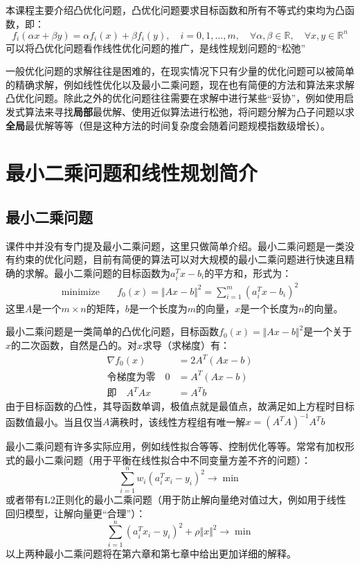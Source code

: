 \documentclass[12pt,a4paper]{book}
\begin{document}
本课程主要介绍凸优化问题，凸优化问题要求目标函数和所有不等式约束均为凸函数，即：
$$f_i(\alpha x + \beta y) = \alpha f_i(x) + \beta f_i(y) , \quad i = 0, 1, \ldots, m,\quad \forall \alpha, \beta \in \mathbb{R} ,\quad \forall x, y \in \mathbb{R}^n $$
可以将凸优化问题看作线性优化问题的推广，是线性规划问题的“松弛”

一般优化问题的求解往往是困难的，在现实情况下只有少量的优化问题可以被简单的精确求解，例如线性优化以及最小二乘问题，现在也有简便的方法和算法来求解凸优化问题。除此之外的优化问题往往需要在求解中进行某些“妥协”，例如使用启发式算法来寻找\textbf{局部}最优解、使用近似算法进行松弛，将问题分解为凸子问题以求\textbf{全局}最优解等等（但是这种方法的时间复杂度会随着问题规模指数级增长）。

\section{最小二乘问题和线性规划简介}
\subsection{最小二乘问题}
课件中并没有专门提及最小二乘问题，这里只做简单介绍。最小二乘问题是一类没有约束的优化问题，目前有简便的算法可以对大规模的最小二乘问题进行快速且精确的求解。最小二乘问题的目标函数为$a_i^Tx-b_i$的平方和，形式为：
\begin{align*}
\text{minimize} \quad & f_0(x) = \Vert Ax - b \Vert^2  = \sum_{i=1}^m (a_i^Tx - b_i)^2
\end{align*}
这里$A$是一个$m \times n$的矩阵，$b$是一个长度为$m$的向量，$x$是一个长度为$n$的向量。

最小二乘问题是一类简单的凸优化问题，目标函数$f_0(x)=\Vert Ax - b \Vert^2$是一个关于$x$的二次函数，自然是凸的。对$x$求导（求梯度）有：
\begin{align*}
\nabla f_0(x) &= 2A^T(Ax - b) \\
\text{令梯度为零} \quad 0&=A^T(Ax - b) \\
\text{即} \quad A^TAx &= A^Tb
\end{align*}
由于目标函数的凸性，其导函数单调，极值点就是最值点，故满足如上方程时目标函数值最小。当且仅当$A$满秩时，该线性方程组有唯一解$x=(A^TA)^{-1}A^Tb$

最小二乘问题有许多实际应用，例如线性拟合等等、控制优化等等。常常有加权形式的最小二乘问题（用于平衡在线性拟合中不同变量方差不齐的问题）：
$$ \sum_{i=1}^n w_i(a_i^Tx_i - y_i)^2 \to \min$$
或者带有L2正则化的最小二乘问题（用于防止解向量绝对值过大，例如用于线性回归模型，让解向量更“合理”）：
$$ \sum_{i=1}^n (a_i^Tx_i - y_i)^2 + \rho \Vert x \Vert^2 \to \min$$
以上两种最小二乘问题将在第六章和第七章中给出更加详细的解释。
\end{document}
